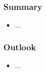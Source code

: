 \documentclass{beamer}
\begin{document}
  \begin{frame}
    \frametitle{Summary}
      \begin{itemize}
        \item ...
      \end{itemize}
  \end{frame}

  \begin{frame}
    \frametitle{Outlook}
      \begin{itemize}
        \item ...
      \end{itemize}
  \end{frame}
\end{document}
